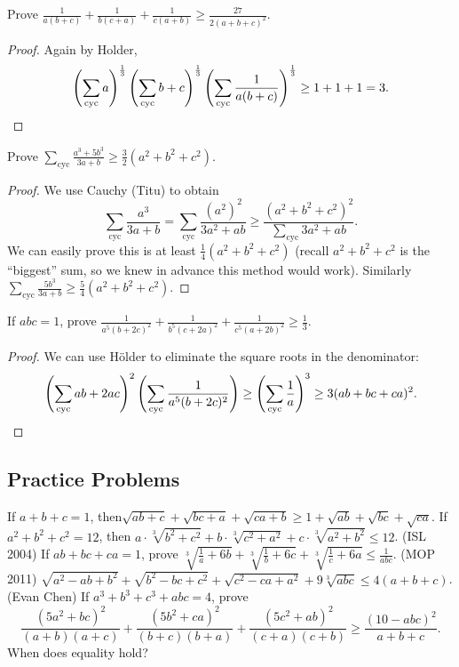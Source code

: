 \documentclass[11pt]{scrartcl}
\begin{document}
\begin{example}
  [Balkan] Prove $\frac{1}{a(b+c)} + \frac{1}{b(c+a)} + \frac{1}{c(a+b)} \ge \frac{27}{2(a+b+c)^2}$.
\end{example}
\begin{proof}
  Again by Holder,
  \[
    \left( \sum_{\text{cyc}} a \right)^{\frac 13}
    \left( \sum_{\text{cyc}} b+c \right)^{\frac 13}
    \left( \sum_{\text{cyc}} \frac{1}{a(b+c)} \right)^{\frac13}
    \ge 1+1+1
    = 3. \qedhere \]
\end{proof}

\begin{example}
  [JMO 2012] Prove $\sum_{\text{cyc}} \frac{a^3+5b^3}{3a+b} \ge \frac 32 \left( a^2+b^2+c^2 \right)$.
\end{example}
\begin{proof}
  We use Cauchy (Titu) to obtain
  \[ \sum_{\text{cyc}} \frac{a^3}{3a+b}  = \sum_{\text{cyc}} \frac{(a^2)^2}{3a^2+ab} \ge \frac{(a^2+b^2+c^2)^2}{\sum_{\text{cyc}} 3a^2+ab}. \]
  We can easily prove this is at least $\frac14 (a^2+b^2+c^2)$
  (recall $a^2+b^2+c^2$ is the ``biggest'' sum,
  so we knew in advance this method would work).
  Similarly $\sum_{\text{cyc}} \frac{5b^3}{3a+b} \ge \frac 54 (a^2+b^2+c^2)$.
\end{proof}

\begin{example}
   If $abc=1$, prove $ \frac{1}{a^5(b+2c)^2}+\frac{1}{b^5(c+2a)^2}+\frac{1}{c^5(a+2b)^2}\ge\frac{1}{3} $.
\end{example}
\begin{proof}
  We can use H\"older to eliminate the square roots in the denominator:
  \[ \left(\sum_{\text{cyc}}ab+2 ac\right)^2\left(\sum_{\text{cyc}}\frac{1}{a^5(b+2c)^2}\right)\ge\left(\sum_{\text{cyc}}\frac{1}{a}\right)^3\ge 3(ab+bc+ca)^2. \qedhere \]
\end{proof}


\subsection{Practice Problems}
\begin{enumerate}
  \ii If $a+b+c=1$, then$\sqrt{ab+c}+\sqrt{bc+a}+\sqrt{ca+b} \ge 1+\sqrt{ab}+\sqrt{bc}+\sqrt{ca}$.
  \ii If $a^2+b^2+c^2=12$, then $a\cdot\sqrt[3]{b^2+c^2}+b\cdot\sqrt[3]{c^2+a^2}+c\cdot\sqrt[3]{a^2+b^2}\leq 12$.
  \ii (ISL 2004) If $ab+bc+ca=1$, prove $ \sqrt[3]{\frac{1}{a}+6b}+\sqrt[3]{\frac{1}{b}+6c}+\sqrt[3]{\frac{1}{c}+6a }\leq\frac{1}{abc}$.
  \ii (MOP 2011) $\sqrt{a^2-ab+b^2}+\sqrt{b^2-bc+c^2} + \sqrt{c^2-ca+a^2} + 9\sqrt[3]{abc} \le 4(a+b+c)$.
  \ii (Evan Chen) If $a^3+b^3+c^3+abc=4$, prove
  \[ \frac{(5a^2+bc)^2}{(a+b)(a+c)}+\frac{(5b^2+ca)^2}{(b+c)(b+a)}+\frac{(5c^2+ab)^2}{(c+a)(c+b)}\ge\frac{(10-abc)^2}{a+b+c}. \]
  When does equality hold?
\end{enumerate}
\end{document}
